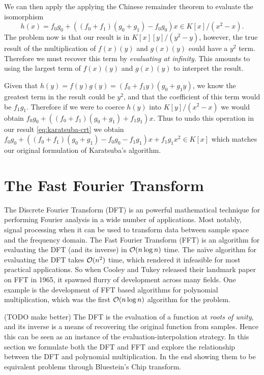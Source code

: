 We can then apply the applying the Chinese remainder theorem to evaluate the isomorphism
\begin{equation}\label{eq:karatsuba-crt}
    h(x) = f_0g_0 + ((f_0 + f_1)(g_0 + g_1) - f_0g_0)x \in K[x]/(x^2 - x).
\end{equation}
The problem now is that our result is in $K[x][y]/(y^2 - y)$, however, the true result of the multiplication of $f(x)(y)$ and $g(x)(y)$ could have a $y^2$ term. Therefore we must recover this term by \emph{evaluating at infinity}. This amounts to using the largest term of $f(x)(y)$ and $g(x)(y)$ to interpret the result.

\medskip 

Given that $h(y) = f(y)g(y) = (f_0 + f_1y)(g_0 + g_1 y)$, we know the greatest term in the result could be $y^2$, and that the coefficient of this term would be $f_1g_1$. Therefore if we were to coerce $h(y)$ into $K[y]/(x^2 - x)$ we would obtain $f_0g_0 + ((f_0 + f_1)(g_0 + g_1) + f_1g_1)x$. Thus to undo this operation in our result \eqref{eq:karatsuba-crt} we obtain $f_0g_0 + ((f_0 + f_1)(g_0 + g_1) - f_0g_0 - f_1g_1)x + f_1g_1x^2 \in K[x]$ which matches our original formulation of Karatsuba's algorithm.

\section{The Fast Fourier Transform}


The Discrete Fourier Transform (DFT) is an powerful mathematical technique for performing Fourier analysis in a wide number of applications. Most notably, signal processing when it can be used to transform data between sample space and the frequency domain. The Fast Fourier Transform (FFT) is an algorithm for evaluating the DFT (and its inverse) in $\mathcal O(n \log n)$ time. The na\"{i}ve algorithm for evaluating the DFT takes $\mathcal O(n^2)$ time, which rendered it infeasible for most practical applications. So when Cooley and Tukey released their landmark paper on FFT in 1965, it spawned flurry of development across many fields. One example is the development of FFT based algorithms for polynomial multiplication, which was the first $\mathcal O(n \log n)$ algorithm for the problem.


(TODO make better)
The DFT is the evaluation of a function at \textit{roots of unity}, and its inverse is a means of recovering the original function from samples. Hence this can be seen as an instance of the evaluation-interpolation strategy. 
In this section we formulate both the DFT and FFT and explore the relationship between the DFT and polynomial multiplication. In the end showing them to be equivalent problems through Bluestein's Chip transform.

